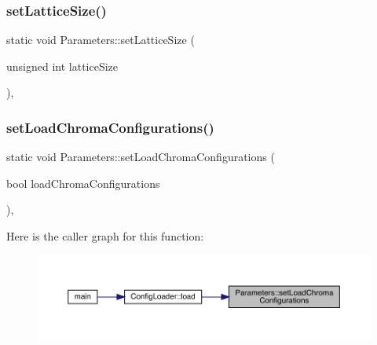 \subsubsection{\texorpdfstring{setLatticeSize()}{setLatticeSize()}}
{\footnotesize\ttfamily static void Parameters\+::set\+Lattice\+Size (\begin{DoxyParamCaption}\item[{unsigned int}]{lattice\+Size }\end{DoxyParamCaption})\hspace{0.3cm}{\ttfamily [inline]}, {\ttfamily [static]}}

\mbox{\label{class_parameters_a632a2371d7b5d157df2dd42e7b6ab843}} 
\subsubsection{\texorpdfstring{setLoadChromaConfigurations()}{setLoadChromaConfigurations()}}
{\footnotesize\ttfamily static void Parameters\+::set\+Load\+Chroma\+Configurations (\begin{DoxyParamCaption}\item[{bool}]{load\+Chroma\+Configurations }\end{DoxyParamCaption})\hspace{0.3cm}{\ttfamily [inline]}, {\ttfamily [static]}}

Here is the caller graph for this function\+:\nopagebreak
\begin{figure}[H]
\begin{center}
\leavevmode
\includegraphics[width=350pt]{class_parameters_a632a2371d7b5d157df2dd42e7b6ab843_icgraph}
\end{center}
\end{figure}
\mbox{\label{class_parameters_aa7e911174ec1991f6750b9774b184fd3}} 
